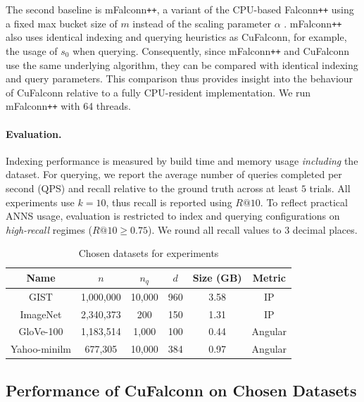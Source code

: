 \documentclass{article}
\newcommand{\sz}{s_0}
\newcommand{\cf}{CuFalconn\xspace}
\newcommand{\fpp}{Falconn\texttt{++}\xspace}
\newcommand{\glv}{GloVe-100\xspace}
\newcommand{\imgnt}{ImageNet\xspace}
\newcommand{\gist}{GIST\xspace}
\newcommand{\ymlm}{Yahoo-minilm\xspace}
\begin{document}
The second baseline is mFalconn\texttt{++}, a variant of the CPU-based \fpp using a fixed max bucket size of $m$ instead of the scaling parameter $\alpha$ \cite{CEOs_GitHub}. mFalconn\texttt{++} also uses identical indexing and querying heuristics as \cf, for example, the usage of $\sz$ when querying. Consequently, since mFalconn\texttt{++} and \cf use the same underlying algorithm, they can be compared with identical indexing and query parameters. This comparison thus provides insight into the behaviour of \cf relative to a fully CPU-resident implementation. We run mFalconn\texttt{++} with 64 threads.

\paragraph{Evaluation.} 

Indexing performance is measured by build time and memory usage \textit{including} the dataset. For querying, we report the average number of queries completed per second (QPS) and recall relative to the ground truth across at least $5$ trials. All experiments use $k=10$, thus recall is reported using $R@10$. To reflect practical ANNS usage, evaluation is restricted to index and querying configurations on \emph{high-recall} regimes ($R@10 \geq 0.75$). We round all recall values to $3$ decimal places. 

\begin{table}[H]
    \centering
    \begin{tabular}{c|c|c|c|c|c}
         Name & $n$ & $n_q$ & $d$ & Size (GB) & Metric  \\
         \hline
         \gist \cite{jegou2010product} & 1,000,000 & 10,000 & 960 & 3.58 & IP \\ 
         \imgnt \cite{ILSVRC15} & 2,340,373 & 200  & 150 & 1.31 & IP \\
         \glv \cite{jegou2010product} & 1,183,514 & 1,000 & 100 & 0.44 & Angular \\ 
         \ymlm \cite{jaasaari2025vibe} & 677,305 & 10,000 & 384 & 0.97 & Angular
    \end{tabular}
    \caption{Chosen datasets for experiments}
    \label{tab:datasets}
\end{table}

\subsection{Performance of \cf on Chosen Datasets}
\label{sec:dataset-perf}
\end{document}
